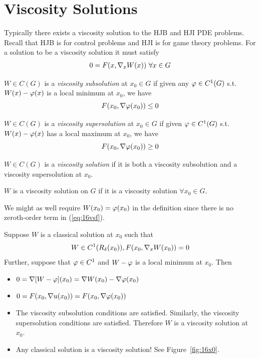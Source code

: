 \section{Viscosity Solutions}
Typically there exists a viscosity solution to the HJB and HJI PDE problems.
Recall that HJB is for control problems and HJI is for game theory problems.
For a solution to be a viscosity solution it must satisfy
\begin{align}
\label{eq:16vsf}
0 = F(x,\nabla_xW(x))~\forall x\in G
\end{align}

\begin{definition}
$W\in C(G)$ is a \textit{viscosity subsolution} at $x_0\in G$ if given any $\varphi\in C^1(G)$ s.t. $W(x)-\varphi(x)$ is a local minimum at $x_0$, we have
$$F(x_0,\nabla\varphi(x_0))\leq0$$
\end{definition}

\begin{definition}
$W\in C(G)$ is a \textit{viscosity supersolution} at $x_0\in G$ if given $\varphi\in C^1(G)$ s.t. $W(x)-\varphi(x)$ has a local maximum at $x_0$, we have
$$F(x_0,\nabla\varphi(x_0))\geq0$$
\end{definition}

\begin{definition}
$W\in C(G)$ is a \textit{viscosity solution} if it is both a viscosity subsolution and a viscosity supersolution at $x_0$.
\end{definition}

\begin{definition}
$W$ is a viscosity solution on $G$ if it is a viscosity solution $\forall x_0\in G$.
\end{definition}

\begin{remark}
We might as well require $W(x_0)=\varphi(x_0)$ in the definition since there is no zeroth-order term in (\ref{eq:16vsf}).
\end{remark}

\begin{remark}
Suppose $W$ is a classical solution at $x_0$ such that
$$W\in C^1(R_\delta(x_0)), F(x_0,\nabla_xW(x_0))=0$$
Further, suppose that $\varphi\in C^1$ and $W-\varphi$ is a local minimum at $x_0$.
Then
\begin{itemize}
\item $0 = \nabla[W-\varphi](x_0) = \nabla W(x_0)-\nabla\varphi(x_0)$
\item $0 = F(x_0,\nabla u(x_0)) = F(x_0,\nabla\varphi(x_0))$
\item The viscosity subsolution conditions are satisfied.
      Similarly, the viscosity supersolution conditions are satisfied.
      Therefore $W$ is a viscosity solution at $x_0$.
\item Any classical solution is a viscosity solution! See Figure~\ref{fig:16x0}.
\end{itemize}
\end{remark}

